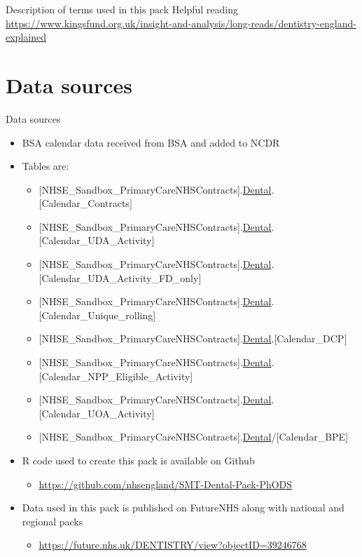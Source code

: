 \documentclass[
  8pt,
  ignorenonframetext,
  aspectratio = 169]{beamer}
\providecommand{\tightlist}{%
  \setlength{\itemsep}{0pt}\setlength{\parskip}{0pt}}
\begin{document}
\begin{frame}{Description of terms used in this pack}
Helpful reading
\url{https://www.kingsfund.org.uk/insight-and-analysis/long-reads/dentistry-england-explained}
\end{frame}

\hypertarget{data-sources}{%
\section{Data sources}\label{data-sources}}

\begin{frame}{Data sources}
\protect\hypertarget{data-sources-1}{}
\begin{itemize}
\tightlist
\item
  BSA calendar data received from BSA and added to NCDR
\item
  Tables are:

  \begin{itemize}
  \tightlist
  \item
    {[}NHSE\_Sandbox\_PrimaryCareNHSContracts{]}.\protect\hyperlink{dental}{Dental}.{[}Calendar\_Contracts{]}
  \item
    {[}NHSE\_Sandbox\_PrimaryCareNHSContracts{]}.\protect\hyperlink{dental}{Dental}.{[}Calendar\_UDA\_Activity{]}
  \item
    {[}NHSE\_Sandbox\_PrimaryCareNHSContracts{]}.\protect\hyperlink{dental}{Dental}.{[}Calendar\_UDA\_Activity\_FD\_only{]}
  \item
    {[}NHSE\_Sandbox\_PrimaryCareNHSContracts{]}.\protect\hyperlink{dental}{Dental}.{[}Calendar\_Unique\_rolling{]}
  \item
    {[}NHSE\_Sandbox\_PrimaryCareNHSContracts{]}.\protect\hyperlink{dental}{Dental}.{[}Calendar\_DCP{]}
  \item
    {[}NHSE\_Sandbox\_PrimaryCareNHSContracts{]}.\protect\hyperlink{dental}{Dental}.{[}Calendar\_NPP\_Eligible\_Activity{]}
  \item
    {[}NHSE\_Sandbox\_PrimaryCareNHSContracts{]}.\protect\hyperlink{dental}{Dental}.{[}Calendar\_UOA\_Activity{]}
  \item
    {[}NHSE\_Sandbox\_PrimaryCareNHSContracts{]}.\protect\hyperlink{dental}{Dental}/{[}Calendar\_BPE{]}
  \end{itemize}
\item
  R code used to create this pack is available on Github

  \begin{itemize}
  \tightlist
  \item
    \url{https://github.com/nhsengland/SMT-Dental-Pack-PhODS}
  \end{itemize}
\item
  Data used in this pack is published on FutureNHS along with national
  and regional packs

  \begin{itemize}
  \tightlist
  \item
    \url{https://future.nhs.uk/DENTISTRY/view?objectID=39246768}
  \end{itemize}
\end{itemize}
\end{frame}
\end{document}
